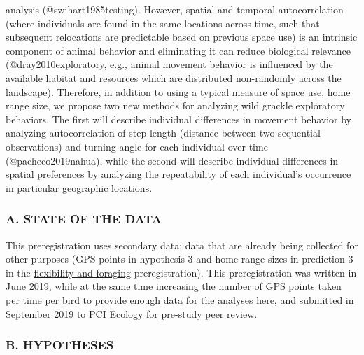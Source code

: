 \documentclass[]{article}
\begin{document}
analysis (@swihart1985testing). However, spatial and temporal
autocorrelation (where individuals are found in the same locations
across time, such that subsequent relocations are predictable based on
previous space use) is an intrinsic component of animal behavior and
eliminating it can reduce biological relevance (@dray2010exploratory,
e.g., animal movement behavior is influenced by the available habitat
and resources which are distributed non-randomly across the landscape).
Therefore, in addition to using a typical measure of space use, home
range size, we propose two new methods for analyzing wild grackle
exploratory behaviors. The first will describe individual differences in
movement behavior by analyzing autocorrelation of step length (distance
between two sequential observations) and turning angle for each
individual over time (@pacheco2019nahua), while the second will describe
individual differences in spatial preferences by analyzing the
repeatability of each individual's occurrence in particular geographic
locations.

\subsubsection{A. STATE OF THE DATA}\label{a.-state-of-the-data}

This preregistration uses secondary data: data that are already being
collected for other purposes (GPS points in hypothesis 3 and home range
sizes in prediction 3 in the
\href{http://corinalogan.com/Preregistrations/g_flexforaging.html}{flexibility
and foraging} preregistration). This preregistration was written in June
2019, while at the same time increasing the number of GPS points taken
per time per bird to provide enough data for the analyses here, and
submitted in September 2019 to PCI Ecology for pre-study peer review.

\subsubsection{B. HYPOTHESES}\label{b.-hypotheses}
\end{document}
